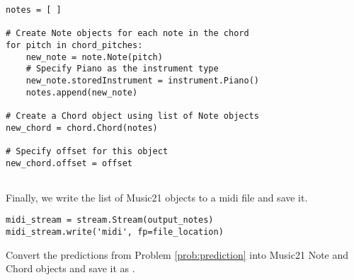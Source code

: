 \begin{lstlisting}
notes = [ ]

# Create Note objects for each note in the chord
for pitch in chord_pitches:
    new_note = note.Note(pitch)
    # Specify Piano as the instrument type
    new_note.storedInstrument = instrument.Piano() 
    notes.append(new_note)
	
# Create a Chord object using list of Note objects
new_chord = chord.Chord(notes)

# Specify offset for this object
new_chord.offset = offset
	
\end{lstlisting}

\noindent Finally, we write the list of Music21 objects to a midi file and save it.


\begin{lstlisting}
midi_stream = stream.Stream(output_notes)
midi_stream.write('midi', fp=file_location)
\end{lstlisting}

\begin{problem}
Convert the predictions from Problem \ref{prob:prediction} into Music21 Note and Chord objects and save it as .
\end{problem}